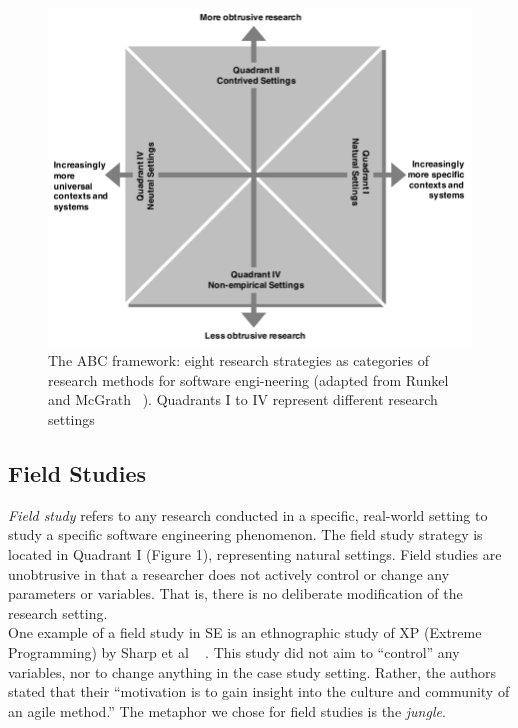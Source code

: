 \documentclass[runningheads]{llncs}
\begin{document}
\begin{figure}
\includegraphics[width=\textwidth]{fig1.png}
\caption{The ABC framework: eight research strategies as categories of research methods for software engi-neering (adapted from Runkel and McGrath ~\cite{ref_article5}). Quadrants I to IV represent different research settings} \label{fig1}
\end{figure}
\subsection{Field Studies}
\emph{Field study} refers to any research conducted in a specific, real-world setting to study a specific software engineering phenomenon. The field study strategy is located in Quadrant I (Figure 1), representing natural settings. Field studies are unobtrusive in that a researcher does not actively control or change any parameters or variables. That is, there is no deliberate modification of the research setting.
\\
One example of a field study in SE is an ethnographic study of XP (Extreme Programming) by
Sharp et al ~\cite{ref_article6} . This study did not aim to “control” any variables, nor to change anything in the case study setting. Rather, the authors stated that their “motivation is to gain insight into the culture and community of an agile method.” The metaphor we chose for field studies is the \emph{jungle}. 
\end{document}
